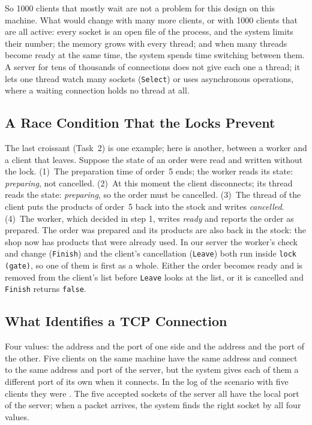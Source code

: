 \documentclass[12pt,a4paper]{article}
\begin{document}
\begin{table}[H]
  \centering
  \caption{The server with idle clients connected}
  
  \label{tab:idle}
\end{table}

So 1000 clients that mostly wait are not a problem for this design on this machine. What would change with many more clients, or with 1000 clients that are all active: every socket is an open file of the process, and the system limits their number; the memory grows with every thread; and when many threads become ready at the same time, the system spends time switching between them. A server for tens of thousands of connections does not give each one a thread; it lets one thread watch many sockets (\texttt{Select}) or uses asynchronous operations, where a waiting connection holds no thread at all.

\subsection{A Race Condition That the Locks Prevent}

The last croissant (Task~2) is one example; here is another, between a worker and a client that leaves. Suppose the state of an order were read and written without the lock. (1)~The preparation time of order~5 ends; the worker reads its state: \textit{preparing}, not cancelled. (2)~At this moment the client disconnects; its thread reads the state: \textit{preparing}, so the order must be cancelled. (3)~The thread of the client puts the products of order~5 back into the stock and writes \textit{cancelled}. (4)~The worker, which decided in step 1, writes \textit{ready} and reports the order as prepared. The order was prepared and its products are also back in the stock: the shop now has products that were already used. In our server the worker's check and change (\texttt{Finish}) and the client's cancellation (\texttt{Leave}) both run inside \texttt{lock (gate)}, so one of them is first as a whole. Either the order becomes ready and is removed from the client's list before \texttt{Leave} looks at the list, or it is cancelled and \texttt{Finish} returns \texttt{false}.

\subsection{What Identifies a TCP Connection}

Four values: the address and the port of one side and the address and the port of the other. Five clients on the same machine have the same address and connect to the same address and port of the server, but the system gives each of them a different port of its own when it connects. In the log of the scenario with five clients they were \twoEndpoints. The five accepted sockets of the server all have the local port of the server; when a packet arrives, the system finds the right socket by all four values.
\end{document}
